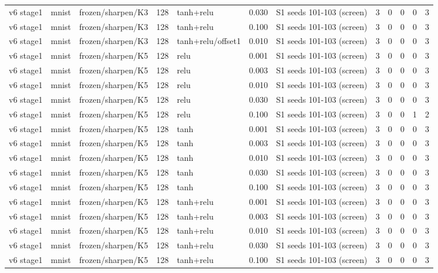 \begin{table}[htbp]
{\begin{tabular}{@{}lllrlrlrrrrr@{}}
v6 stage1 & mnist & frozen/sharpen/K3 & 128 & tanh+relu & 0.030 & S1 seeds 101-103 (screen) & 3 & 0 & 0 & 0 & 3 \\
v6 stage1 & mnist & frozen/sharpen/K3 & 128 & tanh+relu & 0.100 & S1 seeds 101-103 (screen) & 3 & 0 & 0 & 0 & 3 \\
v6 stage1 & mnist & frozen/sharpen/K3 & 128 & tanh+relu/offset1 & 0.010 & S1 seeds 101-103 (screen) & 3 & 0 & 0 & 0 & 3 \\
v6 stage1 & mnist & frozen/sharpen/K5 & 128 & relu & 0.001 & S1 seeds 101-103 (screen) & 3 & 0 & 0 & 0 & 3 \\
v6 stage1 & mnist & frozen/sharpen/K5 & 128 & relu & 0.003 & S1 seeds 101-103 (screen) & 3 & 0 & 0 & 0 & 3 \\
v6 stage1 & mnist & frozen/sharpen/K5 & 128 & relu & 0.010 & S1 seeds 101-103 (screen) & 3 & 0 & 0 & 0 & 3 \\
v6 stage1 & mnist & frozen/sharpen/K5 & 128 & relu & 0.030 & S1 seeds 101-103 (screen) & 3 & 0 & 0 & 0 & 3 \\
v6 stage1 & mnist & frozen/sharpen/K5 & 128 & relu & 0.100 & S1 seeds 101-103 (screen) & 3 & 0 & 0 & 1 & 2 \\
v6 stage1 & mnist & frozen/sharpen/K5 & 128 & tanh & 0.001 & S1 seeds 101-103 (screen) & 3 & 0 & 0 & 0 & 3 \\
v6 stage1 & mnist & frozen/sharpen/K5 & 128 & tanh & 0.003 & S1 seeds 101-103 (screen) & 3 & 0 & 0 & 0 & 3 \\
v6 stage1 & mnist & frozen/sharpen/K5 & 128 & tanh & 0.010 & S1 seeds 101-103 (screen) & 3 & 0 & 0 & 0 & 3 \\
v6 stage1 & mnist & frozen/sharpen/K5 & 128 & tanh & 0.030 & S1 seeds 101-103 (screen) & 3 & 0 & 0 & 0 & 3 \\
v6 stage1 & mnist & frozen/sharpen/K5 & 128 & tanh & 0.100 & S1 seeds 101-103 (screen) & 3 & 0 & 0 & 0 & 3 \\
v6 stage1 & mnist & frozen/sharpen/K5 & 128 & tanh+relu & 0.001 & S1 seeds 101-103 (screen) & 3 & 0 & 0 & 0 & 3 \\
v6 stage1 & mnist & frozen/sharpen/K5 & 128 & tanh+relu & 0.003 & S1 seeds 101-103 (screen) & 3 & 0 & 0 & 0 & 3 \\
v6 stage1 & mnist & frozen/sharpen/K5 & 128 & tanh+relu & 0.010 & S1 seeds 101-103 (screen) & 3 & 0 & 0 & 0 & 3 \\
v6 stage1 & mnist & frozen/sharpen/K5 & 128 & tanh+relu & 0.030 & S1 seeds 101-103 (screen) & 3 & 0 & 0 & 0 & 3 \\
v6 stage1 & mnist & frozen/sharpen/K5 & 128 & tanh+relu & 0.100 & S1 seeds 101-103 (screen) & 3 & 0 & 0 & 0 & 3 \\

\end{tabular}}
\end{table}

